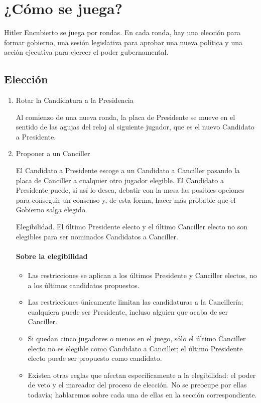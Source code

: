 \documentclass[13pt,a4paper,twocolumn,titlepage]{scrartcl}
\begin{document}
	\section*{¿Cómo se juega?}
	Hitler Encubierto se juega por rondas. En cada ronda, hay una \textcolor{Blue3}{elección} para formar gobierno, una \textcolor{Blue3}{sesión legislativa} para aprobar una nueva política y una \textcolor{Blue3}{acción ejecutiva} para ejercer el poder gubernamental.
	\subsection*{Elección}
	\begin{enumerate}
		\item \textcolor{Blue3}{Rotar la Candidatura a la Presidencia}
		
		Al comienzo de una nueva ronda, la placa de Presidente se mueve en el sentido de las agujas del reloj al siguiente jugador, que es el nuevo Candidato a Presidente.
		
		\item \textcolor{Blue3}{Proponer a un Canciller}
		
		El Candidato a Presidente escoge a un Candidato a Canciller pasando la placa de Canciller a cualquier otro jugador elegible. El Candidato a Presidente puede, si así lo desea, debatir con la mesa las posibles opciones para conseguir un consenso y, de esta forma, hacer más probable que el Gobierno salga elegido. 
		
		\textcolor{Blue3}{Elegibilidad.} El último Presidente electo y el último Canciller electo no son elegibles para ser nominados Candidatos a Canciller.
		
		\vspace*{-8mm}
		\paragraph{\textcolor{SeaGreen4}{Sobre la elegibilidad}}
		\textcolor{SeaGreen4}
		{
			\begin{itemize}
				\item Las restricciones se aplican a los últimos Presidente y Canciller electos, no a los últimos candidatos propuestos.
				\item Las restricciones únicamente limitan las candidaturas a la Cancillería; cualquiera puede ser Presidente, incluso alguien que acaba de ser Canciller.
				\item Si quedan cinco jugadores o menos en el juego, sólo el último Canciller electo no es elegible como Candidato a Canciller; el último Presidente electo puede ser propuesto como candidato.
				\item Existen otras reglas que afectan específicamente a la elegibilidad: el poder de veto y el marcador del proceso de elección. No se preocupe por ellas todavía; hablaremos sobre cada una de ellas en la sección correspondiente.
			\end{itemize}
		}
		

\end{enumerate}
\end{document}
